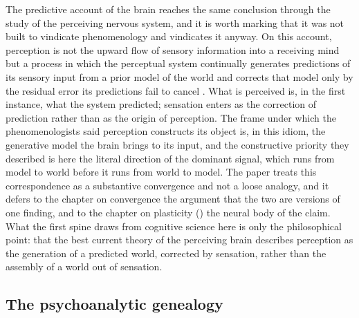 The predictive account of the brain reaches the same conclusion through the study of the perceiving nervous system, and it is worth marking that it was not built to vindicate phenomenology and vindicates it anyway. On this account, perception is not the upward flow of sensory information into a receiving mind but a process in which the perceptual system continually generates predictions of its sensory input from a prior model of the world and corrects that model only by the residual error its predictions fail to cancel \parencite{friston2010}. What is perceived is, in the first instance, what the system predicted; sensation enters as the correction of prediction rather than as the origin of perception. The frame under which the phenomenologists said perception constructs its object is, in this idiom, the generative model the brain brings to its input, and the constructive priority they described is here the literal direction of the dominant signal, which runs from model to world before it runs from world to model. The paper treats this correspondence as a substantive convergence and not a loose analogy, and it defers to the chapter on convergence the argument that the two are versions of one finding, and to the chapter on plasticity () the neural body of the claim. What the first spine draws from cognitive science here is only the philosophical point: that the best current theory of the perceiving brain describes perception as the generation of a predicted world, corrected by sensation, rather than the assembly of a world out of sensation.

\subsection{The psychoanalytic genealogy}
\label{p23:sub:gen-psychoanalysis}

